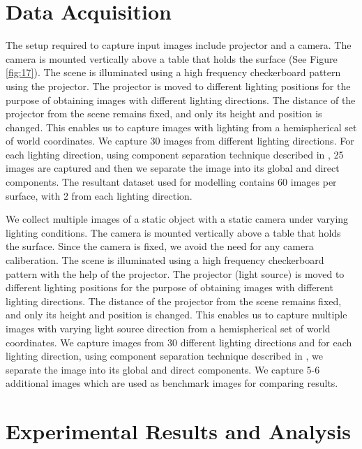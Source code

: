 \section{Data Acquisition}

The setup required to capture input images include projector and a camera. The
camera is mounted vertically above a table that holds the surface (See Figure \ref{fig:17}). The scene is
illuminated using a high frequency checkerboard pattern using the projector. The
projector is moved to different lighting positions for the purpose of obtaining
images with different lighting directions. The distance of the projector from
the scene remains fixed, and only its height and position is changed. This
enables us to capture images with lighting from a hemispherical set of world
coordinates. We capture 30 images from different lighting directions. For each
lighting direction, using component separation technique described in \cite{B4},
25 images are captured and then we separate the image into its global and direct components. The resultant
dataset used for modelling contains 60 images per surface, with 2 from each lighting direction.

We collect multiple images of a static object with a static camera under varying
lighting conditions. The
camera is mounted vertically above a table that holds the surface. Since the camera is fixed, we avoid the
need for any camera caliberation. 
The scene is illuminated using a high frequency checkerboard pattern with the help of the projector. The
projector (light source) is moved to different lighting positions for the purpose of obtaining
images with different lighting directions. 
The distance of the projector from
the scene remains fixed, and only its height and position is changed. This
enables us to capture multiple images with varying light source direction from a hemispherical set of world
coordinates. We capture images from 30 different lighting directions and for each
lighting direction, using component separation technique described in \cite{A9},
we separate the image into its global and direct components. We capture 5-6 additional images which are used as 
benchmark images for comparing results.  

\section{Experimental Results and Analysis}

